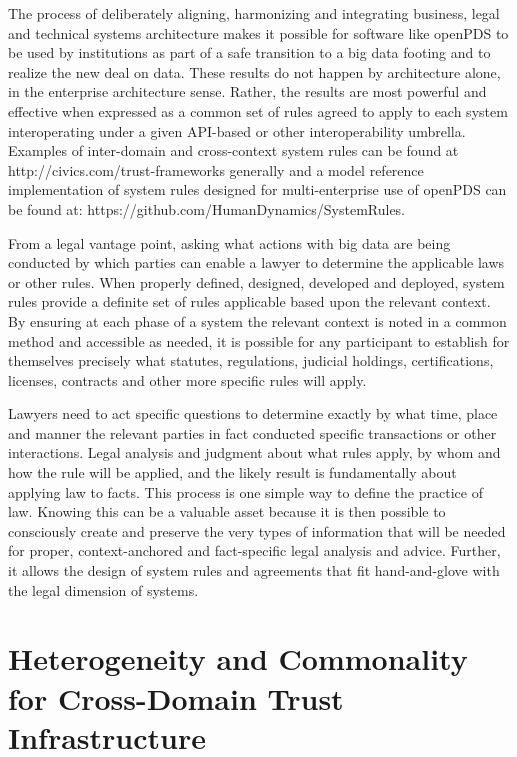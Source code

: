 The process of deliberately aligning, harmonizing and integrating business, legal and technical systems architecture makes it possible for software like openPDS to be used by institutions as part of a safe transition to a big data footing and to realize the new deal on data. These results do not happen by architecture alone, in the enterprise architecture sense. Rather, the results are most powerful and effective when expressed as a common set of rules agreed to apply to each system interoperating under a given API-based or other interoperability umbrella. Examples of inter-domain and cross-context system rules can be found at http://civics.com/trust-frameworks generally and a model reference implementation of system rules designed for multi-enterprise use of openPDS can be found at: https://github.com/HumanDynamics/SystemRules.

From a legal vantage point, asking what actions with big data are being conducted by which parties can enable a lawyer to determine the applicable laws or other rules. When properly defined, designed, developed and deployed, system rules provide a definite set of rules applicable based upon the relevant context. By ensuring at each phase of a system the relevant context is noted in a common method and accessible as needed, it is possible for any participant to establish for themselves precisely what statutes, regulations, judicial holdings, certifications, licenses, contracts and other more specific rules will apply.

Lawyers need to act specific questions to determine exactly by what time, place and manner the relevant parties in fact conducted specific transactions or other interactions. Legal analysis and judgment about what rules apply, by whom and how the rule will be applied, and the likely result is fundamentally about applying law to facts. This process is one simple way to define the practice of law. Knowing this can be a valuable asset because it is then possible to consciously create and preserve the very types of information that will be needed for proper, context-anchored and fact-specific legal analysis and advice. Further, it allows the design of system rules and agreements that fit hand-and-glove with the legal dimension of systems.

\section{Heterogeneity and Commonality for Cross-Domain Trust Infrastructure}

